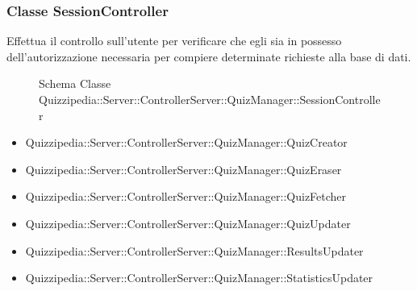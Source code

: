 \subsubsection{Classe SessionController}
Effettua il controllo sull'utente per verificare che egli sia in possesso dell'autorizzazione necessaria per compiere determinate richieste alla base di dati.
\begin{figure}[H]
\centering
\noindent{}
\caption{Schema Classe Quizzipedia::Server::ControllerServer::QuizManager::SessionController}
\end{figure}
\begin{itemize}
\item Quizzipedia::Server::ControllerServer::QuizManager::QuizCreator
\item Quizzipedia::Server::ControllerServer::QuizManager::QuizEraser
\item Quizzipedia::Server::ControllerServer::QuizManager::QuizFetcher
\item Quizzipedia::Server::ControllerServer::QuizManager::QuizUpdater
\item Quizzipedia::Server::ControllerServer::QuizManager::ResultsUpdater
\item Quizzipedia::Server::ControllerServer::QuizManager::StatisticsUpdater
\end{itemize}
